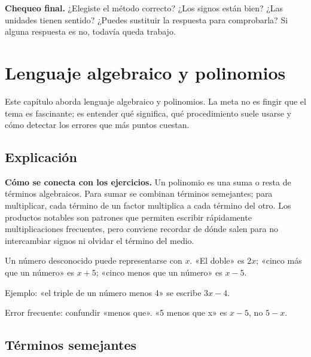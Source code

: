 \documentclass[10pt,oneside,openany]{book}
\begin{document}
\begin{idea}\textbf{Chequeo final.} ¿Elegiste el método correcto? ¿Los signos están bien? ¿Las unidades tienen sentido? ¿Puedes sustituir la respuesta para comprobarla? Si alguna respuesta es no, todavía queda trabajo.\end{idea}



\chapter{Lenguaje algebraico y polinomios}

\begin{idea}
Este capítulo aborda lenguaje algebraico y polinomios. La meta no es fingir que el tema es fascinante; es entender qué significa, qué procedimiento suele usarse y cómo detectar los errores que más puntos cuestan.
\end{idea}

\section{Explicación}

\textbf{Cómo se conecta con los ejercicios.} Un polinomio es una suma o resta de términos algebraicos. Para sumar se combinan términos semejantes; para multiplicar, cada término de un factor multiplica a cada término del otro. Los productos notables son patrones que permiten escribir rápidamente multiplicaciones frecuentes, pero conviene recordar de dónde salen para no intercambiar signos ni olvidar el término del medio.

Un número desconocido puede representarse con $x$. «El doble» es $2x$; «cinco más que un número» es $x+5$; «cinco menos que un número» es $x-5$.



\begin{ejemplo}
Ejemplo: «el triple de un número menos 4» se escribe $3x-4$.
\end{ejemplo}

\begin{ojo}
Error frecuente: confundir «menos que». «5 menos que x» es $x-5$, no $5-x$.
\end{ojo}



\section{Términos semejantes}
\end{document}
